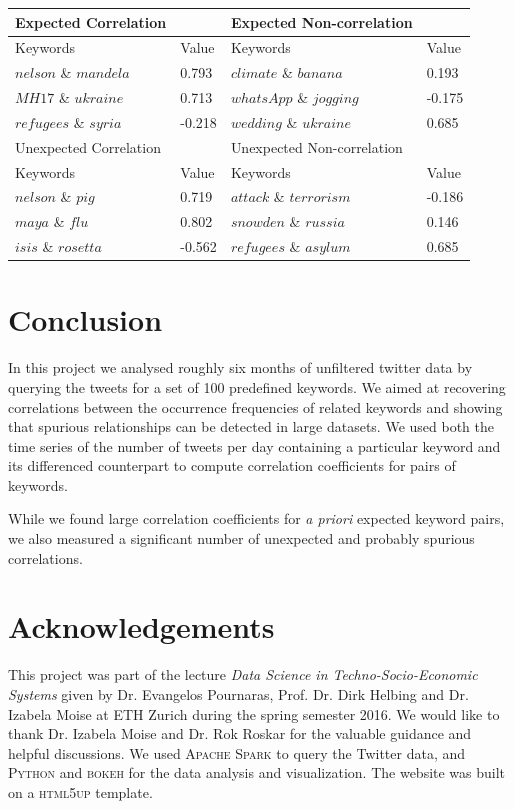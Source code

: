 \documentclass[12pt, a4paper]{article}
\begin{document}
\begin{minipage}{\linewidth}
	\centering
	\label{tab:example_corr} 
	\begin{tabular}{ | l | l || l | l |}
		\hline
		Expected Correlation &  & Expected Non-correlation & \\ \hline
		Keywords & Value & Keywords & Value \\ \hline
		$nelson$ \& $mandela$ & 0.793 & $climate$ \& $banana$ & 0.193\\
		$MH17$ \& $ukraine$ & 0.713 & $whatsApp$ \& $jogging$ & -0.175\\
		$refugees$ \& $syria$ & -0.218 & $wedding$ \& $ukraine$ & 0.685\\ \hline \hline
		
		Unexpected Correlation &  & Unexpected Non-correlation & \\ \hline
		Keywords & Value & Keywords & Value \\ \hline
		$nelson$ \& $pig$ & 0.719 & $attack$ \& $terrorism$ & -0.186\\
		$maya$ \& $flu$ & 0.802 & $snowden$ \& $russia$ &  0.146\\
		$isis$ \& $rosetta$ & -0.562 & $refugees$ \& $asylum$ & 0.685\\ \hline
	\end{tabular}
\end{minipage}


\section{Conclusion}
In this project we analysed roughly six months of unfiltered twitter data by querying the tweets for a set of 100 predefined keywords. We aimed at recovering correlations between the occurrence frequencies of related keywords and showing that spurious relationships can be detected in large datasets. We used both the time series of the number of tweets per day containing a particular keyword and its differenced counterpart to compute correlation coefficients for pairs of keywords. 

While we found large correlation coefficients for \textit{a priori} expected keyword pairs, we also measured a significant number of unexpected and probably spurious correlations.


\section{Acknowledgements}
This project was part of the lecture \textit{Data Science in Techno-Socio-Economic Systems} given by Dr. Evangelos Pournaras, Prof. Dr. Dirk Helbing and Dr. Izabela Moise at ETH Zurich during the spring semester 2016. We would like to thank Dr. Izabela Moise and Dr. Rok Roskar for the valuable guidance and helpful discussions. We used \textsc{Apache Spark} \cite{spark}  to query the Twitter data, and \textsc{Python} \cite{python} and \textsc{bokeh} \cite{bokeh} for the data analysis and visualization. The website was built on a \textsc{html5up} \cite{html5up} template.
\end{document}
